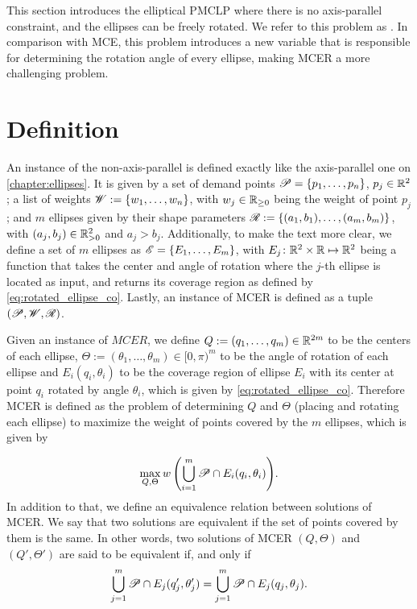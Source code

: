 This section introduces the elliptical PMCLP where there is no axis-parallel constraint, and the ellipses can be freely rotated. We refer to this problem as . In comparison with MCE, this problem introduces a new variable that is responsible for determining the rotation angle of every ellipse, making MCER a more challenging problem.

\section{Definition}

An instance of the non-axis-parallel is defined exactly like the axis-parallel one on \autoref{chapter:ellipses}. It is given by a set of demand points $\mathscr{P}=\{p_1, \dots, p_n\}$, $p_j\in\mathbb{R}^2$; a list of weights $\mathscr{W}:=\{w_1, \dots, w_n\}$, with $w_j\in\mathbb{R}_{\ge0}$ being the weight of point $p_j$;
and $m$ ellipses given by their shape parameters $\mathscr{R}:=\{(a_1, b_1), \dots, (a_m, b_m)\}$, with $(a_j, b_j)\in\mathbb{R}_{>0}^2$ and $a_j>b_j$.
Additionally, to make the text more clear, we define a set of $m$ ellipses as $\mathscr{E} = \{E_1, \dots, E_m\}$, with $E_j\colon \mathbb{R}^2\times\mathbb{R} \mapsto \mathbb{R}^2$ being a function that takes the center and angle of rotation where the $j$-th ellipse is located as input, and returns its coverage region as defined by \autoref{eq:rotated_ellipse_co}.
Lastly, an instance of MCER is defined as a tuple $(\mathscr{P}, \mathscr{W}, \mathscr{R})$.

Given an instance of $MCER$, we define $Q:=(q_1, \dots, q_m) \in \mathbb{R}^{2m}$ to be the centers of each ellipse, $\Theta:=(\theta_1, \dots, \theta_m) \in [0, \pi)^m$ to be the angle of rotation of each ellipse and $E_i(q_i, \theta_i)$ to be the coverage region of ellipse $E_i$ with its center at point $q_i$ rotated by angle $\theta_i$, which is given by \autoref{eq:rotated_ellipse_co}. Therefore MCER is defined as the problem of determining $Q$ and $\Theta$ (placing and rotating each ellipse) to maximize the weight of points covered by the $m$ ellipses, which is given by

\begin{equation}\label{eq:optMCEn}
\max_{Q, \Theta}{w\left(\bigcup_{i=1}^{m} \mathscr{P} \cap E_i(q_i, \theta_i)\right)}.
\end{equation}
In addition to that, we define an equivalence relation between solutions of MCER. We say that two solutions are equivalent if the set of points covered by them is the same. In other words, two solutions of MCER $(Q, \Theta)$ and $(Q', \Theta')$ are said to be equivalent if, and only if 
$$\bigcup_{j=1}^m\mathscr{P} \cap E_j(q_j', \theta_j') = \bigcup_{j=1}^m\mathscr{P} \cap E_j(q_j, \theta_j).$$

